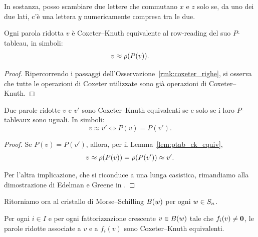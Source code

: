 In sostanza, posso scambiare due lettere che commutano $x$ e $z$ solo se,
da uno dei due lati, c'\`e una lettera $y$ numericamente compresa tra le due.

\begin{lemma}{\cite[Lemma~6.23]{edelman-greene-87}}
    \label{lem:ptab_ck_equiv}
    Ogni parola ridotta $v$ \`e Coxeter--Knuth equivalente al row-reading del suo
    $P$-tableau, in simboli:
    \[
        v \approx \operatorname{\rho}(P(v)).
    \]
\end{lemma}

\begin{proof}
    Ripercorrendo i passaggi dell'Osservazione~\ref{rmk:coxeter_righe}, si osserva
    che tutte le operazioni di Coxeter utilizzate sono gi\`a operazioni di Coxeter--Knuth.
\end{proof}

\begin{lemma}
    {\cite[Theorem~6.24]{edelman-greene-87}}
    \label{lem:ptab_ck_equiv_doppia_freccia}
    Due parole ridotte $v$ e $v'$ sono Coxeter--Knuth equivalenti se e solo se
    i loro $P$-tableaux sono uguali. In simboli:
    \[
        v \approx v' \iff P(v) = P(v').
    \]
\end{lemma}

\begin{proof}
    Se $P(v) = P(v')$, allora, per il Lemma~\ref{lem:ptab_ck_equiv},
    \[
        v \approx \operatorname{\rho}(P(v)) = \operatorname{\rho}(P(v')) \approx v'.
    \]

    Per l'altra implicazione, che si riconduce a una lunga casistica,
    rimandiamo alla dimostrazione di Edelman e Greene in
    \cite[Theorem~6.24]{edelman-greene-87}.
\end{proof}

Ritorniamo ora al cristallo di Morse--Schilling $B(w)$ per ogni $w \in S_n$.

\begin{lemma}
    \label{lem:ms_f_ck_equivalenza}
    Per ogni $i \in I$ e per ogni fattorizzazione crescente $v \in B(w)$
    tale che $f_i(v) \neq \mathbf{0}$,
    le parole ridotte associate a $v$ e a $f_i(v)$ sono Coxeter--Knuth equivalenti.
\end{lemma}

